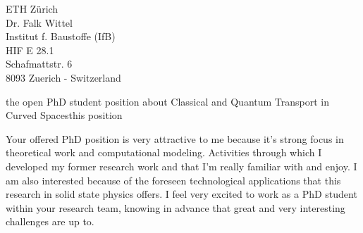 \documentclass{letter}
\begin{document}
\begin{letter}{ETH Zürich\\
Dr. Falk Wittel\\
Institut f. Baustoffe (IfB)\\
HIF E 28.1\\
Schafmattstr. 6\\
8093 Zuerich - Switzerland}

\begin{content}{the open PhD student position about Classical
and Quantum Transport in Curved Spaces}{this position}

  Your offered PhD position is very attractive to me because it's strong
  focus in theoretical work and computational modeling. Activities through
  which I developed my former research work and that I'm really familiar
  with and enjoy. I am also interested because of the foreseen 
  technological applications that this research in solid state physics
  offers. I feel very excited to work as a PhD student within your
  research team, knowing
  in advance that great and very interesting challenges are up to.

\end{content}

\end{letter}
\end{document}
